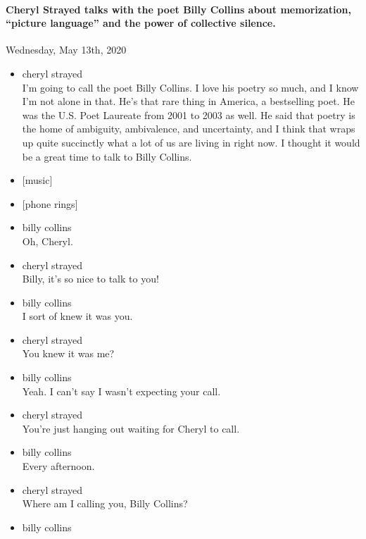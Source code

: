 \hypertarget{cheryl-strayed-talks-with-the-poet-billy-collins-about-memorization-picture-language-and-the-power-of-collective-silence}{%
\paragraph{Cheryl Strayed talks with the poet Billy Collins about
memorization, ``picture language'' and the power of collective
silence.}\label{cheryl-strayed-talks-with-the-poet-billy-collins-about-memorization-picture-language-and-the-power-of-collective-silence}}

Wednesday, May 13th, 2020

\begin{itemize}
\item
  cheryl strayed\\
  I'm going to call the poet Billy Collins. I love his poetry so much,
  and I know I'm not alone in that. He's that rare thing in America, a
  bestselling poet. He was the U.S. Poet Laureate from 2001 to 2003 as
  well. He said that poetry is the home of ambiguity, ambivalence, and
  uncertainty, and I think that wraps up quite succinctly what a lot of
  us are living in right now. I thought it would be a great time to talk
  to Billy Collins.
\item
  {[}music{]}
\item
  {[}phone rings{]}
\item
  billy collins\\
  Oh, Cheryl.
\item
  cheryl strayed\\
  Billy, it's so nice to talk to you!
\item
  billy collins\\
  I sort of knew it was you.
\item
  cheryl strayed\\
  You knew it was me?
\item
  billy collins\\
  Yeah. I can't say I wasn't expecting your call.
\item
  cheryl strayed\\
  You're just hanging out waiting for Cheryl to call.
\item
  billy collins\\
  Every afternoon.
\item
  cheryl strayed\\
  Where am I calling you, Billy Collins?
\item
  billy collins\\

\end{itemize}
